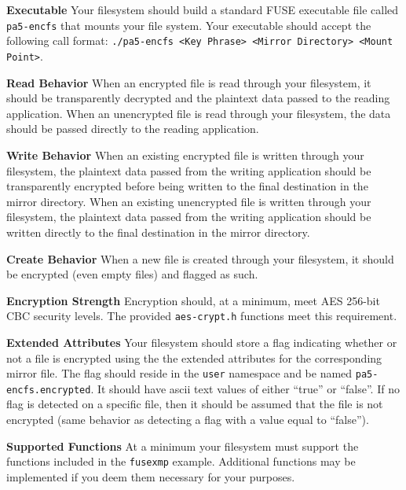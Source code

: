 \documentclass[12pt]{article}
\newenvironment{packed_item}{
\begin{itemize}
  \setlength{\itemsep}{1pt}
  \setlength{\parskip}{0pt}
  \setlength{\parsep}{0pt}
}{\end{itemize}}
\begin{document}
\begin{packed_item}
  \item {\bf Executable} Your filesystem should build a standard FUSE
    executable file called \texttt{pa5-encfs} that mounts your file
    system. Your executable should accept the following call format:
    \texttt{./pa5-encfs <Key Phrase> <Mirror Directory> <Mount Point>}.
  \item {\bf Read Behavior} When an encrypted file is read through your
    filesystem, it should be transparently decrypted and the plaintext
    data passed to the reading application. When an unencrypted file
    is read through your filesystem, the data should be passed directly
    to the reading application.
\item {\bf Write Behavior} When an existing encrypted file is written through your
    filesystem, the plaintext data passed from the writing application
    should be transparently encrypted before being written to the
    final destination in the mirror directory.
    When an existing unencrypted file
    is written through your filesystem, the plaintext data passed
    from the writing application should be written directly to the
    final destination in the mirror directory.
\item {\bf Create Behavior} When a new file is created through your
  filesystem, it should be encrypted (even empty files) and flagged as
  such.
\item {\bf Encryption Strength} Encryption should, at a minimum, meet
  AES 256-bit CBC security levels. The provided \texttt{aes-crypt.h}
  functions meet this requirement.
\item {\bf Extended Attributes} Your filesystem should store a flag
  indicating whether or not a file is encrypted using the the extended
  attributes for the corresponding mirror file. The flag should reside
  in the \texttt{user} namespace\cite{freedesktop-xattr} and be named
  \texttt{pa5-encfs.encrypted}. It should have ascii text values of either
  ``true'' or ``false''. If no flag is detected on a specific file,
  then it should be assumed that the file is not encrypted (same
  behavior as detecting a flag with a value equal to ``false'').
\item {\bf Supported Functions} At a minimum your filesystem must
  support the functions included in the \texttt{fusexmp}
  example. Additional functions may be implemented if you deem them
  necessary for your purposes.
\end{packed_item}
\end{document}
